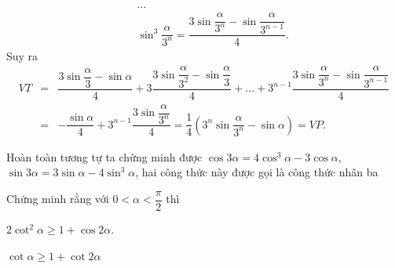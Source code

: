 \begin{bt}
{\begin{enumerate}
\begin{eqnarray*}
				&& \ldots \\
				&& \sin^3\dfrac{\alpha }{3^n}=\dfrac{3\sin \dfrac{\alpha }{3^n}-\sin \dfrac{\alpha }{3^{n-1}}}{4}.
			\end{eqnarray*}
			Suy ra 
			\begin{eqnarray*}
				VT &=& \dfrac{3\sin \dfrac{\alpha }{3}-\sin \alpha }{4}+3\dfrac{3\sin \dfrac{\alpha }{3^2}-\sin \dfrac{\alpha }{3}}{4}+\ldots+3^{n-1}\dfrac{3\sin \dfrac{\alpha }{3^n}-\sin \dfrac{\alpha }{3^{n-1}}}{4}\\
				&=& -\dfrac{\sin \alpha }{4}+3^{n-1}\dfrac{3\sin \dfrac{\alpha }{3^n}}{4}=\dfrac{1}{4}\left( 3^n\sin \dfrac{\alpha }{3^n}-\sin \alpha \right)=VP.
			\end{eqnarray*}
		\end{enumerate}
		\begin{luuy}
			Hoàn toàn tương tự ta chứng minh được $\cos 3\alpha =4\cos^3\alpha -3\cos \alpha$, $\sin 3\alpha =3\sin \alpha -4\sin^3\alpha$, hai công thức này được gọi là công thức nhân ba
		\end{luuy}
	}
\end{bt}

\begin{bt}%

	Chứng minh rằng với $0<\alpha <\dfrac{\pi }{2}$ thì
	\begin{listEX}[2]
		\item $2\cot^2\alpha \ge 1+\cos 2\alpha$.  
		\item $\cot \alpha \ge 1+\cot 2\alpha$
	\end{listEX}
\end{bt}

